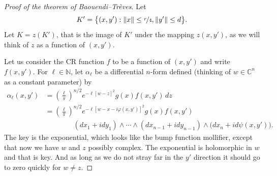 \documentclass[12pt,openany]{book}
\newcommand{\snorm}[1]{\lVert {#1} \rVert}
\newcommand{\C}{{\mathbb{C}}}
\newcommand{\N}{{\mathbb{N}}}
\theoremstyle{plain}
\theoremstyle{remark}
\theoremstyle{definition}
\theoremstyle{exercise}
\theoremstyle{example}
\begin{document}
\begin{proof}[Proof of the theorem of Baouendi--Tr{\`e}ves]
Let
\begin{equation*}
K' = \bigl\{ (x,y') : \snorm{x} \leq \nicefrac{r}{4} , \snorm{y'} \leq d
\bigr\} .
\end{equation*}
Let $K = z(K')$, that is the image of $K'$ under the mapping $z(x,y')$,
as we will think of $z$ as a function of $(x,y')$.

Let us consider the CR function $f$ to be a function of $(x,y')$
and write $f(x,y')$.
For $\ell \in \N$,
let $\alpha_{\ell}$ be a differential $n$-form defined (thinking
of $w \in \C^n$ as a constant parameter) by
\begin{equation*}
\begin{split}
\alpha_{\ell}(x,y')
& =
{\left(\frac{\ell}{\pi}\right)}^{n/2}
e^{-\ell [w - z]^2} g(x) f(x,y')
\,
dz
\\
& =
{\left(\frac{\ell}{\pi}\right)}^{n/2}
e^{-\ell [w - x-i\varphi(x,y')]^2} g(x) f(x,y')
\\
& \qquad \qquad
(dx_1 + idy_1)  \wedge
\cdots \wedge
(dx_{n-1} + i dy_{n-1})
\wedge
\bigl(dx_{n} + i d \psi (x,y') \bigr) .
\end{split}
\end{equation*}
The key is the exponential, which looks like the bump function
mollifier, except that now we have $w$ and $z$
possibly complex.  The exponential is holomorphic in $w$ and that is key.  And as long as we
do not stray far in the $y'$ direction it should go to zero quickly for
$w\not=z$.


\end{proof}
\end{document}
